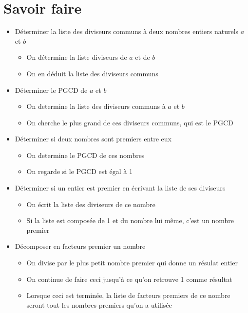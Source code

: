 \documentclass[14pt, letterpaper]{article}
\begin{document}
\section{Savoir faire}
\begin{itemize}
  \item{D\'eterminer la liste des diviseurs communs \`a deux nombres entiers
    naturels \(a\) et \(b\)}
    \begin{itemize}
      \item{On d\'etermine la liste diviseurs de \(a\) et de \(b\)}
      \item{On en d\'eduit la liste des diviseurs communs}
    \end{itemize}

  \item{D\'eterminer le PGCD de \(a\) et \(b\)}
    \begin{itemize}
      \item{On determine la liste des diviseurs communs \`a \(a\) et \(b\)}
      \item{On cherche le plus grand de ces diviseurs communs, qui est le PGCD}
    \end{itemize}

  \item{D\'eterminer si deux nombres sont premiers entre eux}
    \begin{itemize}
      \item{On determine le PGCD de ces nombres}
      \item{On regarde si le PGCD est \'egal \`a 1}
    \end{itemize}

  \item{D\'eterminer si un entier est premier en \'ecrivant la liste de ses diviseurs}
    \begin{itemize}
      \item{On \'ecrit la liste des diviseurs de ce nombre}
      \item{Si la liste est compos\'ee de 1 et du nombre lui m\^eme, c'est un
        nombre premier}
    \end{itemize}

  \item{D\'ecomposer en facteurs premier un nombre}
    \begin{itemize}
      \item{On divise par le plus petit nombre premier qui donne un r\'esulat
        entier}
        \item{On continue de faire ceci jusqu'\`a ce qu'on retrouve 1 comme
        r\'esultat}
        \item{Lorsque ceci est termin\'ee, la liste de facteurs premiers de ce
        nombre seront tout les nombres premiers qu'on a utilis\'ee}
    \end{itemize}


\end{itemize}
\end{document}
